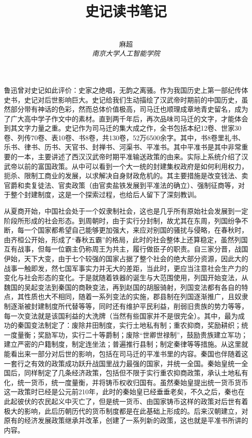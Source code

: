 \documentclass[12pt,a4paper]{ctexart}
\title{\textbf{史记读书笔记}}
\author{
\\
\Large{麻超 \quad 201300066}
\\[6pt]
{ \large \textit{南京大学人工智能学院}}\\[2pt]
}
\date{}
\begin{document}
\maketitle
\setcounter{page}{1}

鲁迅曾对史记如此评价：史家之绝唱，无韵之离骚。作为我国历史上第一部纪传体史书，史记对后世影响巨大。史记给我们生动描绘了汉武帝时期前的中国历史，虽然部分带有神话的色彩，然而总体价值极高，司马迁也顺理成章地青史留名，成为了广大高中学子作文中的素材。直到两千年后，再次品味司马迁的文字，才能体会到其文字力量之重。史记作为司马迁的集大成之作，全书包括本纪12卷、世家30卷、列传70卷、表10卷、书8卷，共130卷，52万6500余字。其中，书8卷里礼书、乐书、律书、历书、天官书、封禅书、河渠书、平准书。其中平准书是其中非常重要的一本，主要讲述了西汉汉武帝时期平准输送政策的由来。实际上系统介绍了汉武帝以前的富国政策。从中可以看到一个大一统的封建集权政府是如何利用权力，扼杀、限制工商业的发展，以求解决自身财政危机的。其主要措施是改变钱法、卖官爵和卖复徒法、官卖政策（由官卖盐铁发展到平准法的确立）、强制征商等，对于整个封建制度，这是一个探索过程，也给后人留下了深刻教训。

从夏商开始，中国社会处于一个奴隶制社会，这也是几乎所有原始社会发展到一定阶段所形成的社会形态。到周朝时，由于实行分封制，故尤其在东周，列国纷争不断，每一个国家都希望自己能够更加强大，来应对别国的骚扰与侵略，在春秋时，由齐桓公开始，形成了“春秋五霸”的格局，此时的社会整体上还算稳定，虽然列国互有战事，但每一位霸主仍称周王为共主，履行做臣子的职责。自三家分晋，战国伊始，天下大变，由于七个较强的国家占据了整个社会的绝大部分资源，因此大的战事一触即发，然七国军事实力并无大的差距，当此时，更应当注意社会生产力的变化与社会形态的变化。于是就随着铁器的诞生与大范围使用，列国开始变法，从魏国的吴起变法到秦国的商鞅变法，再到赵国的胡服骑射，列国变法都有各自的特点，其性质也大不相同，随着一系列变法的实施，郡县制在列国逐渐推广，且奴隶制逐渐被封建制度所代替等等，同时还有维护平民利益，削弱旧贵族的势力等等，每一次变法就是该国利益的大洗牌（当然有些国家并不是很完全）。其中，最为成功的秦国变法制定了：废除井田制度，实行土地私有制；重农抑商，奖励耕织；统一度量衡；奖励军功，实行二十等爵制；废除“世卿世禄制”，鼓励贵族建立军功；建立严密的户籍制度，制定连坐法；普遍推行县制；制定秦律等等措施。从这里就能看出来一部分对后世的影响，包括在司马迁的平准书里的内容。秦国也伴随着这一套行之有效的政策成功跃升战国里战力最强的国家，并统一全国。秦始皇统一全国后，同样制定了几条经济政策，包括但不限于实行重农抑商政策，承认土地私有化，统一货币，统一度量衡，并将铸币权收归国有。虽然秦始皇提出统一货币货币这一政策时已经是公元前210年，此时的秦始皇已经垂垂老矣，不久之后，秦也在此起彼伏的农民起义中灭亡了，但是统一货币、由国家铸币这样的政策对后世有着极大的影响，此后历朝历代的货币制度都是在此基础上形成的。后来汉朝建立，对原有的经济发展政策继承并改革，创建了一系列新的政策，这也就是平准书所讲的内容。
\end{document}
